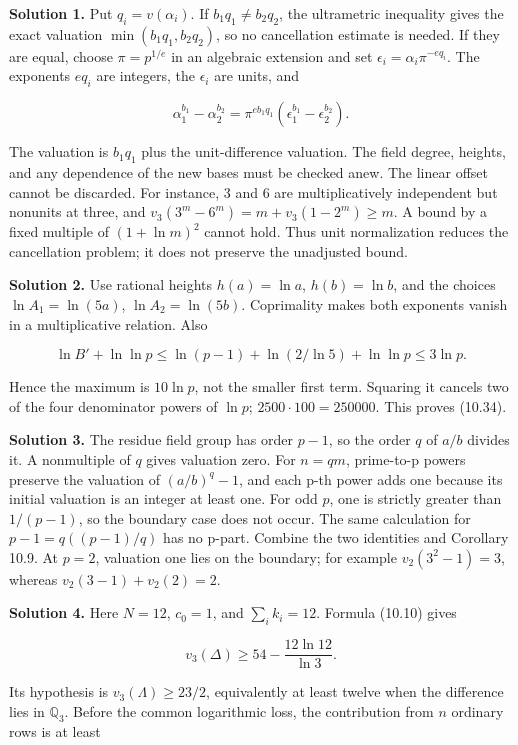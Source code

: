 \documentclass[
  11pt,
  a4paper,
]{article}
\begin{document}
\textbf{Solution 1.} Put \(q_i=v(\alpha_i)\). If \(b_1q_1\ne b_2q_2\),
the ultrametric inequality gives the exact valuation
\(\min(b_1q_1,b_2q_2)\), so no cancellation estimate is needed. If they
are equal, choose \(\pi=p^{1/e}\) in an algebraic extension and set
\(\epsilon_i=\alpha_i\pi^{-e q_i}\). The exponents \(e q_i\) are
integers, the \(\epsilon_i\) are units, and

\[
\alpha_1^{b_1}-\alpha_2^{b_2}
=\pi^{e b_1q_1}(\epsilon_1^{b_1}-\epsilon_2^{b_2}).
\]

The valuation is \(b_1q_1\) plus the unit-difference valuation. The
field degree, heights, and any dependence of the new bases must be
checked anew. The linear offset cannot be discarded. For instance, \(3\)
and \(6\) are multiplicatively independent but nonunits at three, and
\(v_3(3^m-6^m)=m+v_3(1-2^m)\ge m\). A bound by a fixed multiple of
\((1+\ln m)^2\) cannot hold. Thus unit normalization reduces the
cancellation problem; it does not preserve the unadjusted bound.

\textbf{Solution 2.} Use rational heights \(h(a)=\ln a\),
\(h(b)=\ln b\), and the choices \(\ln A_1=\ln(5a)\),
\(\ln A_2=\ln(5b)\). Coprimality makes both exponents vanish in a
multiplicative relation. Also

\[
\ln B'+\ln\ln p
\le\ln(p-1)+\ln(2/\ln5)+\ln\ln p
\le3\ln p.
\]

Hence the maximum is \(10\ln p\), not the smaller first term. Squaring
it cancels two of the four denominator powers of \(\ln p\);
\(2500\cdot100=250000\). This proves (10.34).

\textbf{Solution 3.} The residue field group has order \(p-1\), so the
order \(q\) of \(a/b\) divides it. A nonmultiple of \(q\) gives
valuation zero. For \(n=qm\), prime-to-p powers preserve the valuation
of \((a/b)^q-1\), and each p-th power adds one because its initial
valuation is an integer at least one. For odd \(p\), one is strictly
greater than \(1/(p-1)\), so the boundary case does not occur. The same
calculation for \(p-1=q((p-1)/q)\) has no p-part. Combine the two
identities and Corollary 10.9. At \(p=2\), valuation one lies on the
boundary; for example \(v_2(3^2-1)=3\), whereas \(v_2(3-1)+v_2(2)=2\).

\textbf{Solution 4.} Here \(N=12\), \(c_0=1\), and \(\sum_i k_i=12\).
Formula (10.10) gives

\[
v_3(\Delta)\ge54-\frac{12\ln12}{\ln3}.
\]

Its hypothesis is \(v_3(\Lambda)\ge23/2\), equivalently at least twelve
when the difference lies in \(\mathbb Q_3\). Before the common
logarithmic loss, the contribution from \(n\) ordinary rows is at least
\end{document}
